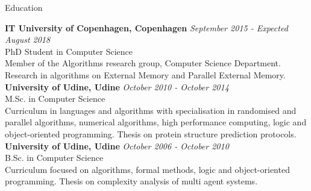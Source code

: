 \documentclass{resume} %
\begin{document}
\begin{rSection}{Education}

{\bf IT University of Copenhagen, Copenhagen} \hfill {\em September 2015 - Expected August 2018} \\ 
PhD Student in Computer Science \\
Member of the Algorithms research group, Computer Science Department. Research in algorithms on External Memory and Parallel External Memory.\\

{\bf University of Udine, Udine} \hfill {\em October 2010 - October 2014}\\ 
M.Sc. in Computer Science \\
Curriculum in languages and algorithms with specialisation in randomised and parallel algorithms, numerical algorithms, high performance computing, logic and object-oriented programming. Thesis on protein structure prediction protocols.\\

{\bf University of Udine, Udine} \hfill {\em October 2006 - October 2010}\\ 
B.Sc. in Computer Science \\
Curriculum focused on algorithms, formal methods, logic and object-oriented programming. Thesis on complexity analysis of multi agent systems.\\


\end{rSection}


\pagebreak
\end{document}
